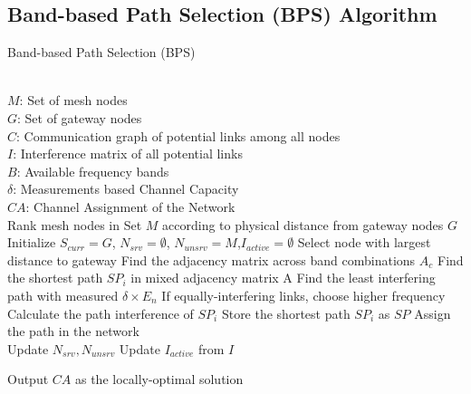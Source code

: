 \subsection{Band-based Path Selection (BPS) Algorithm}
\label{subsec:BPS}

\begin{algorithm}[t]
    \small
\caption{Band-based Path Selection (BPS)}
\label{algorithms:bps}
\begin{algorithmic}[1]
\REQUIRE  ~~\\
	$M$: Set of mesh nodes\\
	$G$: Set of gateway nodes\\
	$C$: Communication graph of potential links among all nodes\\
	$I$: Interference matrix of all potential links \\
	$B$: Available frequency bands \\
	$\delta$: Measurements based Channel Capacity
\ENSURE ~~\\    
$CA$: Channel Assignment of the Network\\
\STATE Rank mesh nodes in Set $M$ according to physical distance from gateway nodes $G$
\STATE Initialize $S_{curr}=G$, $N_{srv}=\emptyset$, $N_{unsrv}=M$,$I_{active}=\emptyset$
\STATE Select node with largest distance to gateway
\STATE Find the adjacency matrix across band combinations $A_c$
\STATE Find the shortest path $SP_i$ in mixed adjacency matrix A 
\STATE Find the least interfering path with measured $\delta \times E_n$
\STATE If equally-interfering links, choose higher frequency
\STATE Calculate the path interference of $SP_i$
\ENDFOR
\STATE Store the shortest path $SP_i$ as $SP$
\ENDFOR
\STATE Assign the path in the network\\
		\STATE Update $N_{srv},N_{unsrv}$
		\STATE Update $I_{active}$ from $I$
\ENDWHILE 

Output $CA$ as the locally-optimal solution\\
\end{algorithmic}
\end{algorithm}

